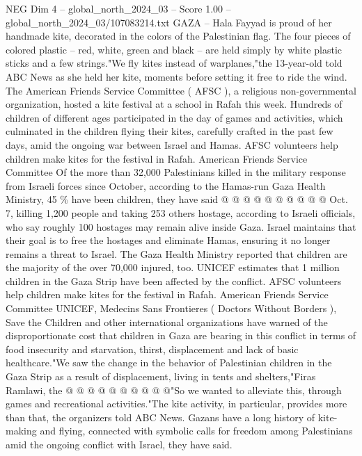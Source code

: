 \begin{textsample}{NEG Dim 4 – global\_north\_2024\_03 – Score 1.00 – global\_north\_2024\_03/107083214.txt}  \label{ex:f4_neg_228}
GAZA -- Hala Fayyad is proud of her handmade kite, decorated in the colors of the Palestinian flag.
The four pieces of colored plastic -- red, white, green and black -- are held simply by white plastic sticks and a few strings."We fly kites instead of warplanes,"the 13-year-old told ABC News as she held her kite, moments before setting it free to ride the wind.
The American Friends Service Committee ( AFSC ), a religious non-governmental organization, hosted a kite festival at a school in Rafah this week.
Hundreds of children of different ages participated in the day of games and activities, which culminated in the children flying their kites, carefully crafted in the past few days, amid the ongoing war between Israel and Hamas.
AFSC volunteers help children make kites for the festival in Rafah.
American Friends Service Committee Of the more than 32,000 Palestinians killed in the military response from Israeli forces since October, according to the Hamas-run Gaza Health Ministry, 45 \% have been children, they have said @ @ @ @ @ @ @ @ @ @ Oct. 7, killing 1,200 people and taking 253 others hostage, according to Israeli officials, who say roughly 100 hostages may remain alive inside Gaza.
Israel maintains that their goal is to free the hostages and eliminate Hamas, ensuring it no longer remains a threat to Israel.
The Gaza Health Ministry reported that children are the majority of the over 70,000 injured, too.
UNICEF estimates that 1 million children in the Gaza Strip have been affected by the conflict.
AFSC volunteers help children make kites for the festival in Rafah.
American Friends Service Committee UNICEF, Medecins Sans Frontieres ( Doctors Without Borders ), Save the Children and other international organizations have warned of the disproportionate cost that children in Gaza are bearing in this conflict in terms of food insecurity and starvation, thirst, displacement and lack of basic healthcare."We saw the change in the behavior of Palestinian children in the Gaza Strip as a result of displacement, living in tents and shelters,"Firas Ramlawi, the @ @ @ @ @ @ @ @ @ @"So we wanted to alleviate this, through games and recreational activities."The kite activity, in particular, provides more than that, the organizers told ABC News.
Gazans have a long history of kite-making and flying, connected with symbolic calls for freedom among Palestinians amid the ongoing conflict with Israel, they have said.

\end{textsample}

